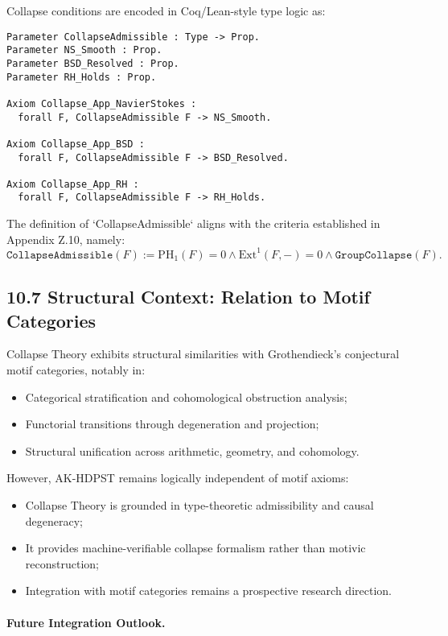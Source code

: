 \documentclass[11pt]{article}
\begin{document}
Collapse conditions are encoded in Coq/Lean-style type logic as:

\begin{lstlisting}[language=Coq]
Parameter CollapseAdmissible : Type -> Prop.
Parameter NS_Smooth : Prop.
Parameter BSD_Resolved : Prop.
Parameter RH_Holds : Prop.

Axiom Collapse_App_NavierStokes :
  forall F, CollapseAdmissible F -> NS_Smooth.

Axiom Collapse_App_BSD :
  forall F, CollapseAdmissible F -> BSD_Resolved.

Axiom Collapse_App_RH :
  forall F, CollapseAdmissible F -> RH_Holds.
\end{lstlisting}

The definition of `CollapseAdmissible` aligns with the criteria established in Appendix Z.10, namely:
\[
\texttt{CollapseAdmissible}(F) := \mathrm{PH}_1(F) = 0 \wedge \mathrm{Ext}^1(F, -) = 0 \wedge \texttt{GroupCollapse}(F).
\]

\subsection*{10.7 Structural Context: Relation to Motif Categories}

Collapse Theory exhibits structural similarities with Grothendieck's conjectural motif categories, notably in:

\begin{itemize}
    \item Categorical stratification and cohomological obstruction analysis;
    \item Functorial transitions through degeneration and projection;
    \item Structural unification across arithmetic, geometry, and cohomology.
\end{itemize}

However, AK-HDPST remains logically independent of motif axioms:

\begin{itemize}
    \item Collapse Theory is grounded in type-theoretic admissibility and causal degeneracy;
    \item It provides machine-verifiable collapse formalism rather than motivic reconstruction;
    \item Integration with motif categories remains a prospective research direction.
\end{itemize}

\paragraph{Future Integration Outlook.}
\end{document}
